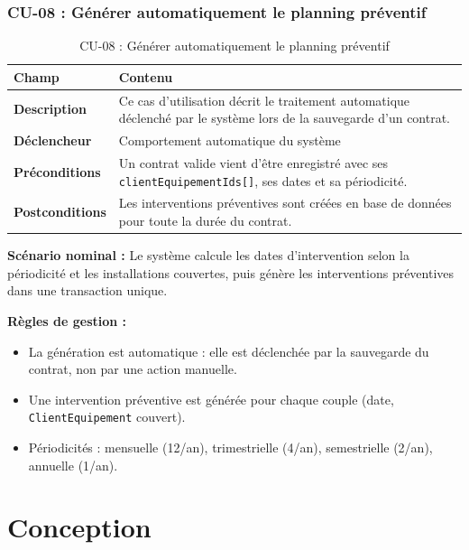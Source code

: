 \subsubsection{CU-08 : Générer automatiquement le planning préventif}

\begin{table}[H]
\centering
\caption{CU-08 : Générer automatiquement le planning préventif}
\label{tab:ch3:cu08}
\begin{tabular}{|p{3.5cm}|p{11cm}|}
\hline
\textbf{Champ} & \textbf{Contenu} \\
\hline
\textbf{Description}
  & Ce cas d'utilisation décrit le traitement automatique déclenché par le système lors
    de la sauvegarde d'un contrat. \\
\hline
\textbf{Déclencheur}
  & Comportement automatique du système \\
\hline
\textbf{Préconditions}
  & Un contrat valide vient d'être enregistré avec ses \texttt{clientEquipementIds[]},
    ses dates et sa périodicité. \\
\hline
\textbf{Postconditions}
  & Les interventions préventives sont créées en base de données pour toute la durée
    du contrat. \\
\hline
\end{tabular}
\end{table}

\textbf{Scénario nominal :} Le système calcule les dates d'intervention selon la périodicité et les installations couvertes, puis génère les interventions préventives dans une transaction unique.

\textbf{Règles de gestion :}
\begin{itemize}
    \item La génération est automatique : elle est déclenchée par la sauvegarde du contrat,
          non par une action manuelle.
    \item Une intervention préventive est générée pour chaque couple
          (date, \texttt{ClientEquipement} couvert).
    \item Périodicités : mensuelle (12/an), trimestrielle (4/an), semestrielle (2/an),
          annuelle (1/an).
\end{itemize}

\section{Conception}

